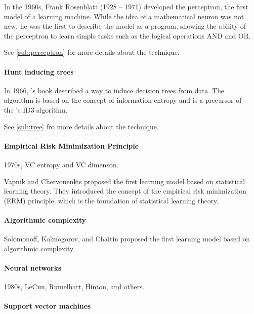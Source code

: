 In the 1960s, Frank Rosenblatt (1928 -- 1971) developed the perceptron, the first model of
a learning machine.  While the idea of a mathematical neuron was not new, he was the first
to describe the model as a program, showing the ability of the perceptron to learn simple
tasks such as the logical operations AND and OR.

See \cref{sub:perceptron} for more details about the technique.

\paragraph{Hunt inducing trees}

In 1966, \citeauthor{Hunt1966}'s book described a way to induce decision trees from
data.  The algorithm is based on the concept of information entropy and is a precursor of
the \citeauthor{Quinlan1986}'s ID3 algorithm.

See \cref{sub:tree} fro more details about the technique.

\paragraph{Empirical Risk Minimization Principle}

1970s, VC entropy and VC dimenson.

Vapnik and Chervonenkis proposed the first learning model based on statistical
learning theory.  They introduced the concept of the empirical risk minimization (ERM)
principle, which is the foundation of statistical learning theory.

\paragraph{Algorithmic complexity}

Solomonoff, Kolmogorov, and Chaitin proposed the first learning model based on
algorithmic complexity.

\paragraph{Neural networks}

1980s, LeCun, Rumelhart, Hinton, and others.

\paragraph{Support vector machines}

